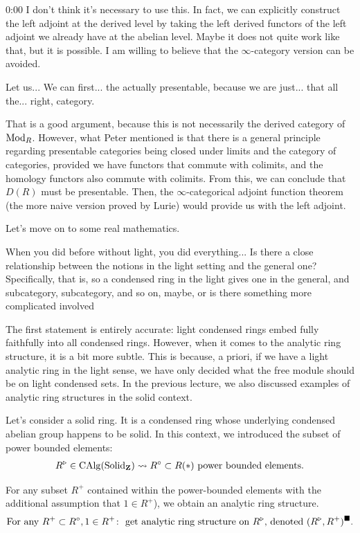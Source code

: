 \begin{unfinished}{0:00}
\ans I don't think it's necessary to use this. In fact, we can explicitly construct the left adjoint at the derived level by taking the left derived functors of the left adjoint we already have at the abelian level. Maybe it does not quite work like that, but it is possible. I am willing to believe that the $\infty$-category version can be avoided.

\scholze Let us... We can first... the actually presentable, because we are just... that all the... right, category. %


\clausen That is a good argument, because this is not necessarily the derived category of $\operatorname{Mod}_R$. However, what Peter mentioned is that there is a general principle regarding presentable categories being closed under limits and the category of categories, provided we have functors that commute with colimits, and the homology functors also commute with colimits. 
From this, we can conclude that $D(R)$ must be presentable. Then, the $\infty$-categorical adjoint function theorem (the more naive version proved by Lurie) would provide us with the left adjoint.

Let's move on to some real mathematics.

\ques When you did before without light, you did everything... Is there a close relationship between the notions in the light setting and the general one? Specifically, that is, so a condensed ring in the light gives one in the general, and subcategory, subcategory, and so on, maybe, or is there something more complicated involved 

\ans The first statement is entirely accurate: light condensed rings embed fully faithfully into all condensed rings. However, when it comes to the analytic ring structure, it is a bit more subtle.
This is because, a priori, if we have a light analytic ring in the light sense, we have only decided what the free module should be on light condensed sets.
In the previous lecture, we also discussed examples of analytic ring structures in the solid context. 

Let's consider  a solid ring. It is a condensed ring whose underlying condensed abelian group happens to be solid. In this context, we introduced the subset of power bounded elements:
\begin{align*}
R^\triangleright \in \operatorname{CAlg}(\mathrm{Solid}_\mathbf Z) \leadsto R^\circ \subset R(\ast) \text{ power bounded elements}.
\end{align*}

For any subset $R^+$ contained within the power-bounded elements with the additional assumption that $1 \in R^+$), we obtain an analytic ring structure.
\begin{align*}
\text{For any } R^+ \subset R^\circ, 1 \in R^+ \colon \text{ get analytic ring structure on } R^\triangleright \text{, denoted } (R^\triangleright, R^+)^\blacksquare.
\end{align*}


\end{unfinished}
